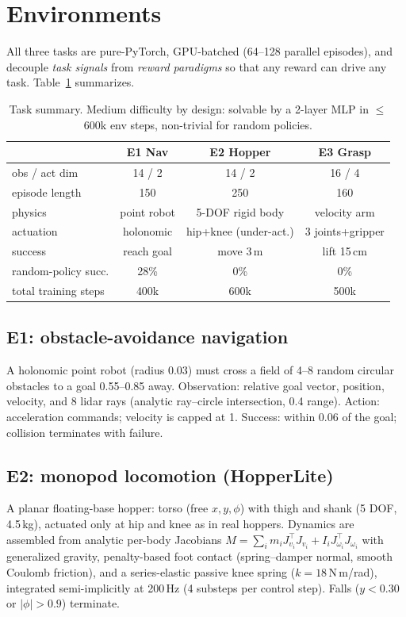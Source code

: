 \documentclass[journal,twoside]{IEEEtran}
\begin{document}
\section{Environments}
\label{sec:envs}
All three tasks are pure-PyTorch, GPU-batched (64--128 parallel episodes),
and decouple \emph{task signals} from \emph{reward paradigms} so that any
reward can drive any task. Table~\ref{tab:envs} summarizes.

\begin{table}[t]
\centering
\caption{Task summary. Medium difficulty by design: solvable by a 2-layer
MLP in $\le$600k env steps, non-trivial for random policies.}
\label{tab:envs}
\begin{tabular}{lccc}
\toprule
 & E1 Nav & E2 Hopper & E3 Grasp \\
\midrule
obs / act dim & 14 / 2 & 14 / 2 & 16 / 4 \\
episode length & 150 & 250 & 160 \\
physics & point robot & 5-DOF rigid body & velocity arm \\
actuation & holonomic & hip+knee (under-act.) & 3 joints+gripper \\
success & reach goal & move 3\,m & lift 15\,cm \\
random-policy succ. & 28\% & 0\% & 0\% \\
total training steps & 400k & 600k & 500k \\
\bottomrule
\end{tabular}
\end{table}

\subsection{E1: obstacle-avoidance navigation}
A holonomic point robot (radius 0.03) must cross a field of 4--8 random
circular obstacles to a goal 0.55--0.85 away. Observation: relative goal
vector, position, velocity, and 8 lidar rays (analytic ray--circle
intersection, 0.4 range). Action: acceleration commands; velocity is
capped at 1. Success: within 0.06 of the goal; collision terminates with
failure.

\subsection{E2: monopod locomotion (HopperLite)}
A planar floating-base hopper: torso (free $x,y,\phi$) with thigh and shank
(5 DOF, 4.5\,kg), actuated only at hip and knee as in real hoppers.
Dynamics are assembled from analytic per-body Jacobians
$M=\sum_i m_iJ_{v_i}^\top J_{v_i}+I_iJ_{\omega_i}^\top J_{\omega_i}$ with
generalized gravity, penalty-based foot contact (spring--damper normal,
smooth Coulomb friction), and a series-elastic passive knee spring
($k{=}18$\,N\,m/rad), integrated semi-implicitly at 200\,Hz (4 substeps per
control step). Falls ($y<0.30$ or $|\phi|>0.9$) terminate.
\end{document}
